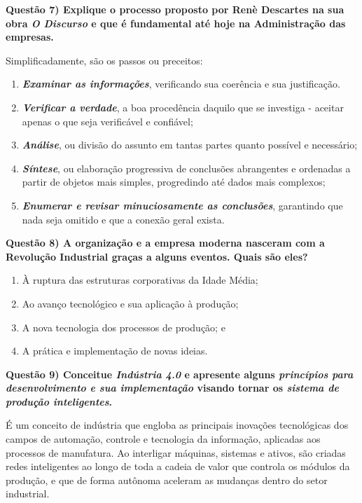 \documentclass{article}
\begin{document}
\noindent \textbf{Questão 7) Explique o processo proposto por Renè Descartes na sua obra \emph{O Discurso} e que é fundamental até hoje na Administração das empresas.}
\par Simplificadamente, são os passos ou preceitos:
\begin{enumerate}
    \item \textbf{\emph{Examinar as informações}}, verificando sua coerência e sua justificação.
    \item \textbf{\emph{Verificar a verdade}}, a boa procedência daquilo que se investiga - aceitar apenas o que seja verificável e confiável;
    \item \textbf{\emph{Análise}}, ou divisão do assunto em tantas partes quanto possível e necessário;
    \item \textbf{\emph{Síntese}}, ou elaboração progressiva de conclusões abrangentes e ordenadas a partir de objetos mais simples, progredindo até dados mais complexos;
    \item \textbf{\emph{Enumerar e revisar minuciosamente as conclusões}}, garantindo que nada seja omitido e que a conexão geral exista.
\end{enumerate}
\pagebreak
\noindent \textbf{Questão 8) A organização e a empresa moderna nasceram com a Revolução Industrial graças a alguns eventos. Quais são eles?}
\begin{enumerate}
    \item À ruptura das estruturas corporativas da Idade Média;
    \item Ao avanço tecnológico e sua aplicação à produção;
    \item A nova tecnologia dos processos de produção; e
    \item A prática e implementação de novas ideias.
\end{enumerate}

\noindent \textbf{Questão 9) Conceitue \emph{Indústria 4.0} e apresente alguns \emph{princípios para desenvolvimento e sua implementação} visando tornar os \emph{sistema de produção inteligentes}.}
\par É um conceito de indústria que engloba as principais inovações tecnológicas dos campos de automação, controle e tecnologia da informação, aplicadas aos processos de manufatura. Ao interligar máquinas, sistemas e ativos, são criadas redes inteligentes ao longo de toda a cadeia de valor que controla os módulos da produção, e que de forma autônoma aceleram as mudanças dentro do setor industrial.
\end{document}
